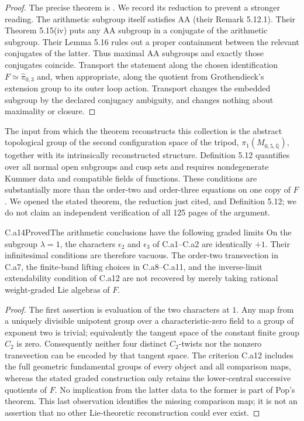 \begin{proof}
The precise theorem is \citet[Theorem 5.17(ii), also Theorem C(ii)]{HMT2025arith}.
We record its reduction to prevent a stronger reading. The arithmetic
subgroup itself satisfies AA (their Remark 5.12.1). Their Theorem
5.15(iv) puts any AA subgroup in a conjugate of the arithmetic subgroup.
Their Lemma 5.16 rules out a proper containment between the relevant
conjugates of the latter. Thus maximal AA subgroups and exactly those
conjugates coincide. Transport the statement along the chosen
identification $F\simeq\widehat\pi_{0,3}$ and, when appropriate, along
the quotient from Grothendieck's extension group to its outer loop
action. Transport changes the embedded subgroup by the declared
conjugacy ambiguity, and changes nothing about maximality or closure.
\end{proof}
The input from which the theorem reconstructs this collection is the
abstract topological group of the second configuration space of the
tripod, $\pi_1(M_{0,5,\overline{\mathbb Q}})$, together with its
intrinsically reconstructed structure. Definition 5.12 quantifies over
all normal open subgroups and cusp sets and requires nondegenerate
Kummer data and compatible fields of functions. These conditions are
substantially more than the order-two and order-three equations on one
copy of $F$. We opened the stated theorem, the reduction just cited,
and Definition 5.12; we do not claim an independent verification of all
125 pages of the argument.

\begin{claim}{C.a14}{Proved}{The arithmetic conclusions have the following graded limits}
On the subgroup $\lambda=1$, the characters $\epsilon_2$ and
$\epsilon_3$ of C.a1--C.a2 are identically $+1$. Their infinitesimal
conditions are therefore vacuous. The order-two transvection in C.a7,
the finite-band lifting choices in C.a8--C.a11, and the inverse-limit
extendability condition of C.a12 are not recovered by merely taking
rational weight-graded Lie algebras of $F$.
\end{claim}

\begin{proof}
The first assertion is evaluation of the two characters at $1$. Any
map from a uniquely divisible unipotent group over a characteristic-zero
field to a group of exponent two is trivial; equivalently the tangent
space of the constant finite group $C_2$ is zero. Consequently neither
four distinct $C_2$-twists nor the nonzero transvection can be encoded by
that tangent space. The criterion C.a12 includes the full geometric
fundamental groups of every object and all comparison maps, whereas
the stated graded construction only retains the lower-central
successive quotients of $F$. No implication from the latter data to the
former is part of Pop's theorem. This last observation identifies the
missing comparison map; it is not an assertion that no other Lie-theoretic
reconstruction could ever exist.
\end{proof}
